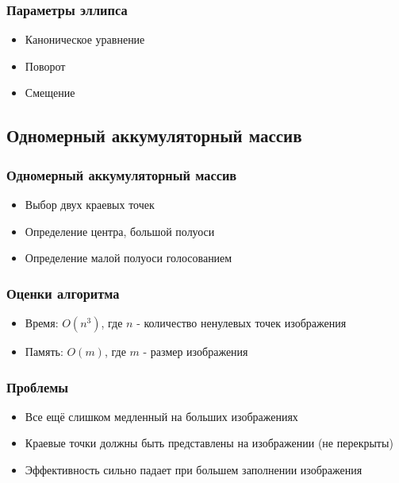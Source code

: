 \documentclass[14pt]{beamer}
\begin{document}
\begin{frame}
\frametitle{Параметры эллипса}
\begin{itemize}
  \item Каноническое уравнение
  \item Поворот
  \item Смещение
\end{itemize}
\end{frame}

\subsection{Одномерный аккумуляторный массив}
\begin{frame}
\frametitle{Одномерный аккумуляторный массив}
\begin{itemize}
  \item Выбор двух краевых точек
  \item Определение центра, большой полуоси
  \item Определение малой полуоси голосованием
\end{itemize}
\end{frame}

\begin{frame}
\frametitle{Оценки алгоритма}
\begin{itemize}
  \item Время: \(O(n^3)\), где \(n\) - количество ненулевых точек изображения
  \item Память: \(O(m)\), где \(m\) - размер изображения
\end{itemize}
\end{frame}

\begin{frame}
\frametitle{Проблемы}
\begin{itemize}
  \item Все ещё слишком медленный на больших изображениях
  \item Краевые точки должны быть представлены на изображении (не перекрыты)
  \item Эффективность сильно падает при большем заполнении изображения
\end{itemize}
\end{frame}

\end{document}
